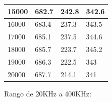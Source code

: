 \begin{table}[H]
\begin{tabular}{l|lll|}
\multicolumn{1}{|l|}{15000} & \multicolumn{1}{l|}{682.7}  & \multicolumn{1}{l|}{242.8}  & 342.6  \\ \hline
\multicolumn{1}{|l|}{16000} & \multicolumn{1}{l|}{683.4}  & \multicolumn{1}{l|}{237.3}  & 343.5  \\ \hline
\multicolumn{1}{|l|}{17000} & \multicolumn{1}{l|}{685.1}  & \multicolumn{1}{l|}{237.5}  & 344.6  \\ \hline
\multicolumn{1}{|l|}{18000} & \multicolumn{1}{l|}{685.7}  & \multicolumn{1}{l|}{223.7}  & 345.2  \\ \hline
\multicolumn{1}{|l|}{19000} & \multicolumn{1}{l|}{686.3}  & \multicolumn{1}{l|}{222.5}  & 343    \\ \hline
\multicolumn{1}{|l|}{20000} & \multicolumn{1}{l|}{687.7}  & \multicolumn{1}{l|}{214.1}  & 341    \\ \hline
\end{tabular}
\end{table}

Rango de 20KHz a 400KHz:

